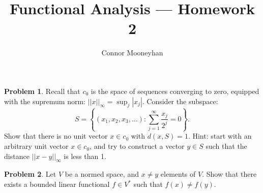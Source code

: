 \documentclass[12pt]{article}
\title{Functional Analysis --- Homework 2}
\author{Connor Mooneyhan}
\date{}
\theoremstyle{definition}
\newtheorem{ex}{Problem}
\begin{document}
\maketitle

\begin{ex}
	Recall that $c_0$ is the space of sequences converging to zero, equipped with the supremum norm: $||x||_\infty = \sup_j |x_j|$.
	Consider the subspace: \begin{equation*}
		S = \left\lbrace (x_1,x_2,x_3,\dots) : \sum_{j=1}^\infty \frac{x_j}{2^j} = 0 \right\rbrace.
	\end{equation*}
	Show that there is no unit vector $x \in c_0$ with $d(x, S) = 1$.
	Hint: start with an arbitrary unit vector $x \in c_0$, and try to construct a vector $y \in S$ such that the distance $||x-y||_\infty$ is less than 1.
\end{ex}

\begin{ex}
	Let $V$ be a normed space, and $x \neq y$ elements of $V$.
	Show that there exists a bounded linear functional $f \in V^*$ such that $f(x) \neq f(y)$.
\end{ex}
\end{document}

